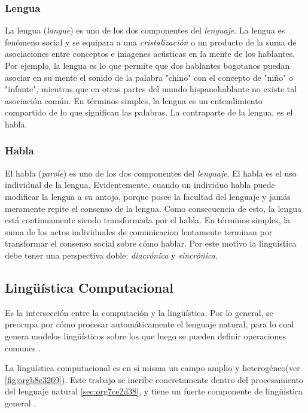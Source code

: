 \documentclass[12pt,letterpaper,twoside]{article}
\begin{document}
\subsubsection{Lengua}
\label{sec:org805985c}

La lengua (\emph{langue}) es uno de los dos componentes del
\emph{lenguaje}.  La lengua es fenómeno social y se equipara a una
\emph{cristalización} o un producto de la suma de asociaciones entre
conceptos e imagenes acústicas en la mente de los hablantes. Por
ejemplo, la lengua es lo que permite que dos hablantes bogotanos
puedan asociar en su mente el sonido de la palabra "chino" con el
concepto de "niño" o "infante", mientras que en otras partes del
mundo hispanohablante no existe tal asociación común.
En términos simples, la lengua es un entendimiento compartido de
lo que significan las palabras. La contraparte de la lengua,
es el habla. 

\subsubsection{Habla}
\label{sec:org298385c}
El habla (\emph{parole}) es uno de los dos componentes del
\emph{lenguaje}. El habla es el uso individual de la lengua.
Evidentemente, cuando un individuo habla puede modificar
la lengua a su antojo, porque posee la facultad del
lenguaje y jamás meramente repite el consenso de la lengua.
Como consecuencia de esto, la lengua está continuamente
siendo transformada por el habla. En términos simples,
la suma de los actos individuales de comunicacion lentamente
terminan por transformar el consenso social sobre cómo
hablar.  Por este motivo la linguística debe tener una
perspectiva doble: \emph{diacrónica} y \emph{sincrónica}.


\subsection{Lingüística Computacional}
\label{sec:orgc0c8f5d}

Es la intersección entre la computación y la lingüística. Por lo
general, se preocupa por cómo procesar automáticamente el
lenguaje natural, para lo cual genera modelos lingüísticos sobre los
que luego se pueden definir operaciones comunes \cite{gelbukh2004}.


La lingüística computacional es en sí misma un campo amplio y
heterogéneo(ver \ref{fig:orgb8c3269}).
Este trabajo se incribe concretamente dentro del procesamiento
del lenguaje natural \ref{sec:org7ce2d38}, y tiene un fuerte componente de
lingüística general .
\end{document}

